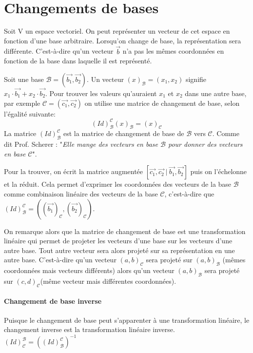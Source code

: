 \documentclass[10pt,a4paper]{book}
\begin{document}
\section{Changements de bases}
Soit V un espace vectoriel. On peut représenter un vecteur de cet espace en fonction d'une base arbitraire. Lorsqu'on change de base, la représentation sera différente. C'est-à-dire qu'un vecteur $\vec{b}$ n'a pas les mêmes coordonnées en fonction de la base dans laquelle il est représenté. \par 
Soit une base $\mathcal{B}=(\vec{b_1}, \vec{b_2})$. Un vecteur $(x)_{\mathcal{B}}=(x_1,x_2)$ signifie $x_1\cdot \vec{b_1}+x_2\cdot \vec{b_2}$. Pour trouver les valeurs qu'auraient $x_1$ et $x_2$ dans une autre base, par exemple $\mathcal{C}=(\vec{c_1}, \vec{c_2})$ on utilise une matrice de changement de base, selon l'égalité suivante: 
\[(Id)^{\mathcal{C}}_{\mathcal{B}} (x)_{\mathcal{B}} = (x)_{\mathcal{C}}\]
La matrice $(Id)^{\mathcal{C}}_{\mathcal{B}}$ est la matrice de changement de base de $\mathcal{B}$ vers $\mathcal{C}$. Comme dit Prof. Scherer : "\textit{Elle mange des vecteurs en base $\mathcal{B}$ pour donner des vecteurs en base $\mathcal{C}$}". \par 
Pour la trouver, on écrit la matrice augmentée $[\vec{c_1},\vec{c_2}\ |\ \vec{b_1},\vec{b_2}]$ puis on l'échelonne et la réduit. Cela permet d'exprimer les coordonnées des vecteurs de la base $\mathcal{B}$ comme combinaison linéaire des vecteurs de la base $\mathcal{C}$, c'est-à-dire que $(Id)^{\mathcal{C}}_{\mathcal{B}} = ((\vec{b_1})_{\mathcal{C}},(\vec{b_2})_{\mathcal{C}})$.\par 
On remarque alors que la matrice de changement de base est une transformation linéaire qui permet de projeter les vecteurs d'une base sur les vecteurs d'une autre base. Tout autre vecteur sera alors projeté sur sa représentation en une autre base. C'est-à-dire qu'un vecteur $(a,b)_\mathcal{C}$ sera projeté sur $(a,b)_\mathcal{B}$ (mêmes coordonnées mais vecteurs différents) alors qu'un vecteur $(a,b)_\mathcal{B}$ sera projeté sur $(c,d)_\mathcal{C}$(même vecteur mais différentes coordonnées). 

\paragraph{Changement de base inverse}
Puisque le changement de base peut s'apparenter à une transformation linéaire, le changement inverse est la transformation linéaire inverse. $(Id)^{\mathcal{B}}_{\mathcal{C}} = ((Id)^{\mathcal{C}}_{\mathcal{B}})^{-1}$
\end{document}
